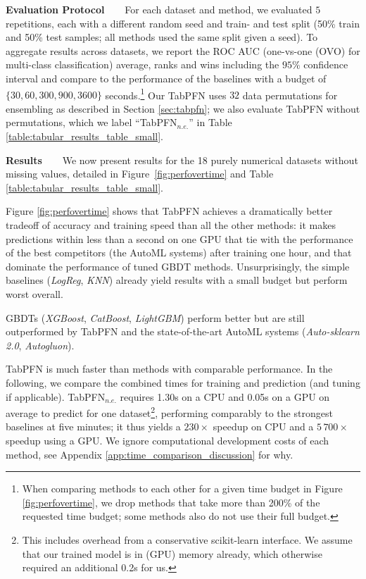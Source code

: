 \textbf{Evaluation Protocol~~~} For each dataset and method, we evaluated $5$ repetitions, each with a different random seed and train- and test split (50\% train and 50\% test samples; all methods used the same split given a seed). To aggregate results across datasets, we report the ROC AUC (one-vs-one (OVO) for multi-class classification) average, ranks and wins including the $95\%$ confidence interval and compare to the performance of the baselines with a budget of $\{30, 60, 300, 900, 3600\}$ seconds.\footnote{When comparing methods to each other for a given time budget in Figure \ref{fig:perfovertime}, we drop methods that take more than 200\% of the requested time budget; some methods also do not use their full budget.} Our TabPFN uses $32$ data permutations for ensembling as described in Section \ref{sec:tabpfn}; we also evaluate TabPFN without permutations, which we label ``TabPFN$_{n.e.}$'' in Table \ref{table:tabular_results_table_small}.

\textbf{Results~~~}
We now present results for the 18 purely numerical datasets without missing values, detailed in Figure~\ref{fig:perfovertime} and Table \ref{table:tabular_results_table_small}. 

Figure \ref{fig:perfovertime} shows that TabPFN achieves a dramatically better tradeoff of accuracy and training speed than all the other methods: it makes predictions within less than a second on one GPU that tie with the performance of the best competitors (the AutoML systems) after training one hour, and that dominate the performance of tuned GBDT methods. Unsurprisingly, the simple baselines (\textit{LogReg}, \textit{KNN}) already yield results with a small budget but perform worst overall.

GBDTs (\textit{XGBoost}, \textit{CatBoost}, \textit{LightGBM}) perform better but are still outperformed by TabPFN and the state-of-the-art AutoML systems (\textit{Auto-sklearn 2.0}, \textit{Autogluon}).

TabPFN is much faster than methods with comparable performance. In the following, we compare the combined times for training and prediction (and tuning if applicable). TabPFN$_{n.e.}$ requires 1.30s on a CPU and 0.05s on a GPU on average to predict for one dataset\footnote{This includes overhead from a conservative scikit-learn interface. We assume that our trained model is in (GPU) memory already, which otherwise required an additional 0.2s for us.}, performing comparably to the strongest baselines at five minutes; it thus yields a $230\times$ speedup on CPU and a $5\,700\times$ speedup using a GPU. We ignore computational development costs of each method, see Appendix \ref{app:time_comparison_discussion} for why.

